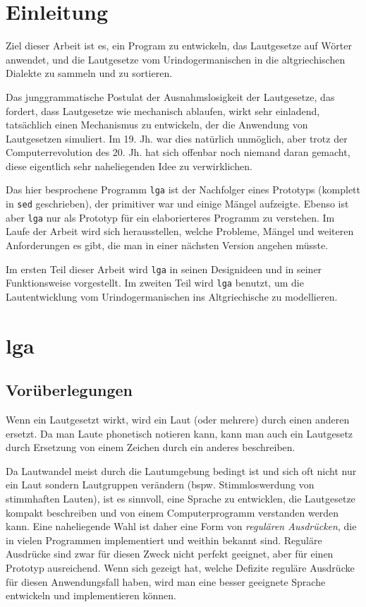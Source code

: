 \documentclass[12pt,a4paper,normalheadings]{scrartcl}
\begin{document}
\section{Einleitung}

Ziel dieser Arbeit ist es, ein Program zu entwickeln,
das Lautgesetze auf Wörter anwendet,
und die Lautgesetze vom Urindogermanischen in die altgriechischen Dialekte
zu sammeln und zu sortieren.

Das junggrammatische Postulat der Ausnahmslosigkeit der Lautgesetze,
das fordert, dass Lautgesetze wie mechanisch ablaufen,
wirkt sehr einladend,
tatsächlich einen Mechanismus zu entwickeln,
der die Anwendung von Lautgesetzen simuliert.
Im 19. Jh. war dies natürlich unmöglich,
aber trotz der Computerrevolution des 20. Jh. hat sich offenbar
noch niemand daran gemacht,
diese eigentlich sehr naheliegenden Idee zu verwirklichen.

Das hier besprochene Programm \texttt{lga} ist
der Nachfolger eines Prototyps (komplett in \texttt{sed} geschrieben),
der primitiver war und einige Mängel aufzeigte.
Ebenso ist aber \texttt{lga} nur als Prototyp
für ein elaborierteres Programm zu verstehen.
Im Laufe der Arbeit wird sich herausstellen,
welche Probleme, Mängel und weiteren Anforderungen es gibt,
die man in einer nächsten Version angehen müsste.

Im ersten Teil dieser Arbeit wird \texttt{lga}
in seinen Designideen und in seiner Funktionsweise vorgestellt.
Im zweiten Teil wird \texttt{lga} benutzt,
um die Lautentwicklung vom Urindogermanischen ins Altgriechische zu modellieren.

\section{lga}

\subsection{Vorüberlegungen}

Wenn ein Lautgesetzt wirkt,
wird ein Laut (oder mehrere) durch einen anderen ersetzt.
Da man Laute phonetisch notieren kann,
kann man auch ein Lautgesetz durch Ersetzung
von einem Zeichen durch ein anderes beschreiben.

Da Lautwandel meist durch die Lautumgebung bedingt ist
und sich oft nicht nur ein Laut sondern Lautgruppen verändern
(bspw. Stimmloswerdung von stimmhaften Lauten),
ist es sinnvoll,
eine Sprache zu entwicklen,
die Lautgesetze kompakt beschreiben
und von einem Computerprogramm verstanden werden kann.
Eine naheliegende Wahl ist daher eine Form von \emph{regulären Ausdrücken},
die in vielen Programmen implementiert und weithin bekannt sind.
Reguläre Ausdrücke sind zwar für diesen Zweck nicht perfekt geeignet,
aber für einen Prototyp ausreichend.
Wenn sich gezeigt hat,
welche Defizite reguläre Ausdrücke für diesen Anwendungsfall haben,
wird man eine besser geeignete Sprache entwickeln und implementieren können.
\end{document}
